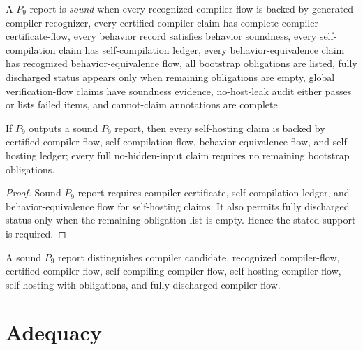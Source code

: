 \begin{definition}
\label{def:self-hosting-sound-p9-report}
A $P_9$ report is \emph{sound} when every recognized compiler-flow is backed by generated compiler recognizer, every certified compiler claim has complete compiler certificate-flow, every behavior record satisfies behavior soundness, every self-compilation claim has self-compilation ledger, every behavior-equivalence claim has recognized behavior-equivalence flow, all bootstrap obligations are listed, fully discharged status appears only when remaining obligations are empty, global verification-flow claims have soundness evidence, no-host-leak audit either passes or lists failed items, and cannot-claim annotations are complete.
\end{definition}

\begin{theorem}
\label{thm:self-hosting-sound-p9-report}
If $P_9$ outputs a sound $P_9$ report, then every self-hosting claim is backed by certified compiler-flow, self-compilation-flow, behavior-equivalence-flow, and self-hosting ledger; every full no-hidden-input claim requires no remaining bootstrap obligations.
\end{theorem}

\begin{proof}
Sound $P_9$ report requires compiler certificate, self-compilation ledger, and behavior-equivalence flow for self-hosting claims. It also permits fully discharged status only when the remaining obligation list is empty. Hence the stated support is required.
\end{proof}

\begin{corollary}
\label{cor:self-hosting-statuses-distinct}
A sound $P_9$ report distinguishes compiler candidate, recognized compiler-flow, certified compiler-flow, self-compiling compiler-flow, self-hosting compiler-flow, self-hosting with obligations, and fully discharged compiler-flow.
\end{corollary}

\section{Adequacy}
\label{sec:self-hosting-adequacy}

